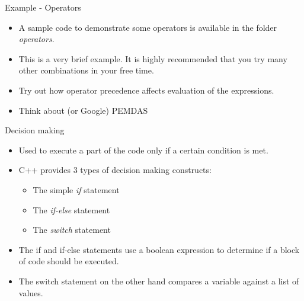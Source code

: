\documentclass[aspectratio=169]{beamer}
\begin{document}
\begin{frame}[fragile]{Example - Operators}
    \begin{itemize}
        \item A sample code to demonstrate some operators is available in the folder \textit{operators}.
        \item This is a very brief example. It is highly recommended that you try many other combinations in your free time.
        \item Try out how operator precedence affects evaluation of the expressions.
        \item Think about (or Google) PEMDAS
    \end{itemize}
\end{frame}

\begin{frame}[fragile]{Decision making}
    \begin{itemize}
        \item Used to execute a part of the code only if a certain condition is met.
        \item C++ provides 3 types of decision making constructs:
        \begin{itemize}
            \item The simple \textit{if} statement
            \item The \textit{if-else} statement
            \item The \textit{switch} statement
        \end{itemize}
        \item The if and if-else statements use a boolean expression to determine if a block of code should be executed.
        \item The switch statement on the other hand compares a variable against a list of values.
    \end{itemize}
\end{frame}
\end{document}
